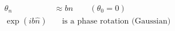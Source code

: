 \documentclass[12pt]{article}
\begin{document}
\fontsize{22}{28}\selectfont
\begin{align*}
\theta_n &\approx bn \qquad(\theta_0=0) \\[0.45em]
\exp(ib\hat{n}) &\quad\text{is a phase rotation (Gaussian)}
\end{align*}
\end{document}
